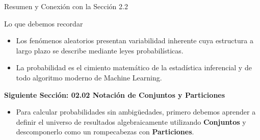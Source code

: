 \documentclass[10pt,aspectratio=169]{beamer}
\begin{document}
\begin{frame}{Resumen y Conexión con la Sección 2.2}
  \begin{block}{Lo que debemos recordar}
    \begin{itemize}
      \item Los fenómenos aleatorios presentan variabilidad inherente cuya estructura a largo plazo se describe mediante leyes probabilísticas. \pause
      \item La probabilidad es el cimiento matemático de la estadística inferencial y de todo algoritmo moderno de Machine Learning.
    \end{itemize}
  \end{block}
  
  \vspace{0.8em}
  \pause
  {\large \color{TecAzulOscuro}\textbf{Siguiente Sección: 02.02 Notación de Conjuntos y Particiones}}
  \vspace{0.3em}
  \begin{itemize}
    \item Para calcular probabilidades sin ambigüedades, primero debemos aprender a definir el universo de resultados algebraicamente utilizando \textbf{Conjuntos} y descomponerlo como un rompecabezas con \textbf{Particiones}.
  \end{itemize}
\end{frame}
\end{document}
